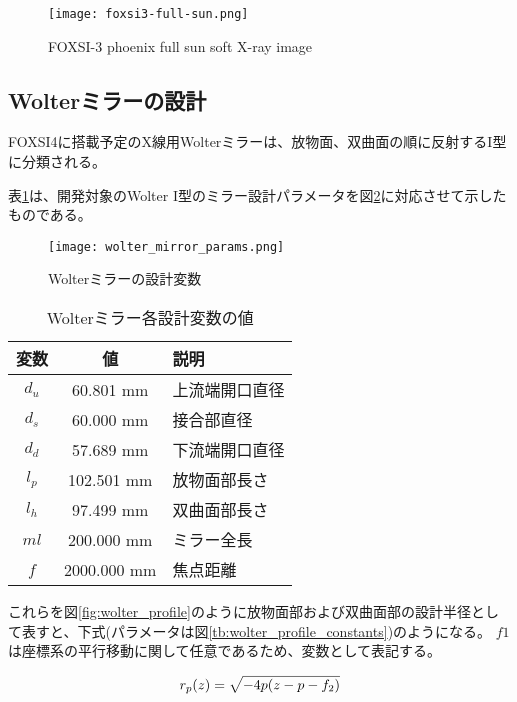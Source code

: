 \begin{figure}[h]
\centering
\texttt{[image: foxsi3-full-sun.png]}
\caption{FOXSI-3 phoenix full sun soft X-ray image \cite{weko_20796_1}}
\label{fig:foxsi-fullsun-image}
\end{figure}

\subsection{Wolterミラーの設計}
\label{chap1_wolter_arrangement}
FOXSI4に搭載予定のX線用Wolterミラーは、放物面、双曲面の順に反射するI型に分類される。

表\ref{tb:wolter_params}は、開発対象のWolter I型のミラー設計パラメータを図\ref{fig:wolter_params}に対応させて示したものである。

\begin{figure}[h!]
\centering
\texttt{[image: wolter\_mirror\_params.png]}
\caption{Wolterミラーの設計変数}
\label{fig:wolter_params}
\end{figure}

\begin{table}[ht]
\begin{center}
  \caption{Wolterミラー各設計変数の値}
  \begin{tabular}{|c|c|l|} \hline
    変数 & 値 & 説明 \\ \hline
    $d_u$ & 60.801 mm & 上流端開口直径 \\
    $d_s$ & 60.000 mm & 接合部直径 \\
    $d_d$ & 57.689 mm & 下流端開口直径 \\
    $l_p$ & 102.501 mm & 放物面部長さ \\
    $l_h$ & 97.499 mm & 双曲面部長さ \\
    $ml$ & 200.000 mm & ミラー全長 \\
    $f$ & 2000.000 mm & 焦点距離 \\ \hline
  \end{tabular}
  \label{tb:wolter_params}
\end{center}
\end{table}

これらを図\ref{fig:wolter_profile}のように放物面部および双曲面部の設計半径として表すと、下式(パラメータは図\ref{tb:wolter_profile_constants})のようになる。
$f1$は座標系の平行移動に関して任意であるため、変数として表記する。

\begin{equation}
    r_p(z) = \sqrt{ -4p(z - p - f_2) } \\
\end{equation}

